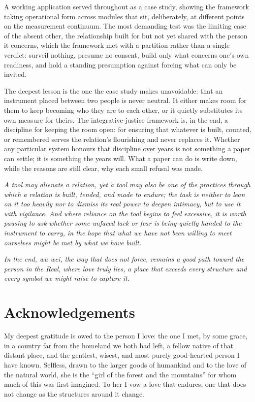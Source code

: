 \documentclass[11pt,a4paper]{article}
\begin{document}
A working application served throughout as a case study, showing the framework taking operational form across modules that sit, deliberately, at different points on the measurement continuum. The most demanding test was the limiting case of the absent other, the relationship built for but not yet shared with the person it concerns, which the framework met with a partition rather than a single verdict: surveil nothing, presume no consent, build only what concerns one's own readiness, and hold a standing presumption against forcing what can only be invited.

The deepest lesson is the one the case study makes unavoidable: that an instrument placed between two people is never neutral. It either makes room for them to keep becoming who they are to each other, or it quietly substitutes its own measure for theirs. The integrative-justice framework is, in the end, a discipline for keeping the room open: for ensuring that whatever is built, counted, or remembered serves the relation's flourishing and never replaces it. Whether any particular system honours that discipline over years is not something a paper can settle; it is something the years will. What a paper can do is write down, while the reasons are still clear, why each small refusal was made.

{\color{warnred}\itshape A tool may alienate a relation, yet a tool may also be one of the practices through which a relation is built, tended, and made to endure; the task is neither to lean on it too heavily nor to dismiss its real power to deepen intimacy, but to use it with vigilance. And where reliance on the tool begins to feel excessive, it is worth pausing to ask whether some unfaced lack or fear is being quietly handed to the instrument to carry, in the hope that what we have not been willing to meet ourselves might be met by what we have built.}

{\color{warnred}\itshape In the end, wu wei, the way that does not force, remains a good path toward the person in the Real, where love truly lies, a place that exceeds every structure and every symbol we might raise to capture it.}

\section*{Acknowledgements}

My deepest gratitude is owed to the person I love: the one I met, by some grace, in a country far from the homeland we both had left, a fellow native of that distant place, and the gentlest, wisest, and most purely good-hearted person I have known. Selfless, drawn to the larger goods of humankind and to the love of the natural world, she is the ``girl of the forest and the mountains'' for whom much of this was first imagined. To her I vow a love that endures, one that does not change as the structures around it change.
\end{document}
